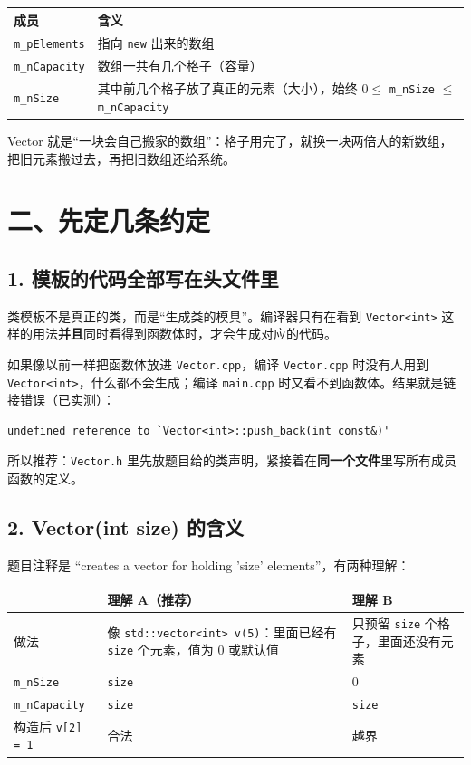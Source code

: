 \documentclass[11pt,a4paper]{article}
\newcommand{\code}[1]{\texttt{#1}}
\begin{document}
\begin{center}
\small
\begin{tabular}{@{}ll@{}}
\toprule
成员 & 含义 \\
\midrule
\code{m\_pElements} & 指向 \code{new} 出来的数组 \\
\code{m\_nCapacity} & 数组一共有几个格子（容量） \\
\code{m\_nSize} & 其中前几个格子放了真正的元素（大小），始终 $0 \le$ \code{m\_nSize} $\le$ \code{m\_nCapacity} \\
\bottomrule
\end{tabular}
\end{center}

\begin{tip}
Vector 就是“一块会自己搬家的数组”：格子用完了，就换一块两倍大的新数组，把旧元素搬过去，再把旧数组还给系统。
\end{tip}

\section{二、先定几条约定}

\subsection{1. 模板的代码全部写在头文件里}

类模板不是真正的类，而是“生成类的模具”。编译器只有在看到 \code{Vector<int>} 这样的用法\textbf{并且}同时看得到函数体时，才会生成对应的代码。

如果像以前一样把函数体放进 \code{Vector.cpp}，编译 \code{Vector.cpp} 时没有人用到 \code{Vector<int>}，什么都不会生成；编译 \code{main.cpp} 时又看不到函数体。结果就是链接错误（已实测）：

\begin{lstlisting}[language={}]
undefined reference to `Vector<int>::push_back(int const&)'
\end{lstlisting}

所以推荐：\code{Vector.h} 里先放题目给的类声明，紧接着在\textbf{同一个文件}里写所有成员函数的定义。

\subsection{2. Vector(int size) 的含义}

题目注释是 “creates a vector for holding 'size' elements”，有两种理解：

\begin{center}
\small
\begin{tabularx}{\linewidth}{@{}lXX@{}}
\toprule
 & 理解 A（推荐） & 理解 B \\
\midrule
做法 & 像 \code{std::vector<int> v(5)}：里面已经有 \code{size} 个元素，值为 0 或默认值 & 只预留 \code{size} 个格子，里面还没有元素 \\
\code{m\_nSize} & \code{size} & 0 \\
\code{m\_nCapacity} & \code{size} & \code{size} \\
构造后 \code{v[2] = 1} & 合法 & 越界 \\
\bottomrule
\end{tabularx}
\end{center}
\end{document}
